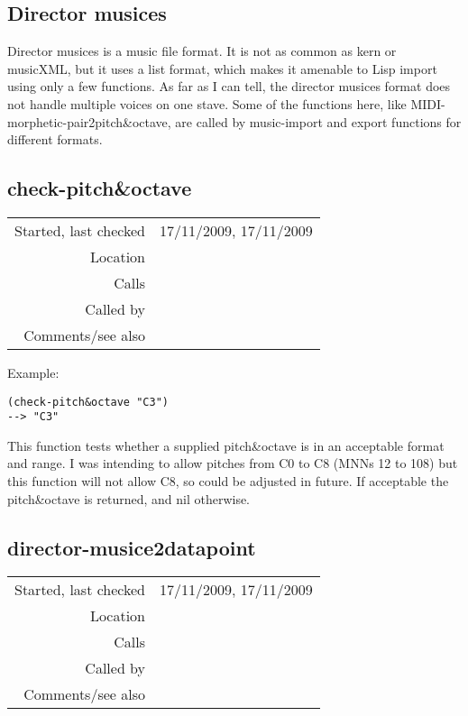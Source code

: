 \subsection{Director musices}\label{sec:director-musices}

Director musices is a music file format. It is not as
common as kern or musicXML, but it uses a list format,
which makes it amenable to Lisp import using only a
few functions. As far as I can tell, the director
musices format does not handle multiple voices on one
stave. Some of the functions here, like
MIDI-morphetic-pair2pitch\&octave, are called by
music-import and export functions for different
formats.


\subsection*{check-pitch\&octave}\label{fun:check-pitch-and-octave}

\vspace{0.3cm}
\begin{tabular}{r|p{8cm}}
Started, last checked & 17/11/2009, 17/11/2009 \\
Location & \nameref{sec:director-musices} \\
Calls & \\
Called by & \\
Comments/see also &
\end{tabular}

\vspace{0.5cm}
\noindent Example:
\begin{verbatim}
(check-pitch&octave "C3")
--> "C3"
\end{verbatim}

\noindent This function tests whether a supplied
pitch\&octave is in an acceptable format and range. I
was intending to allow pitches from C0 to C8 (MNNs 12
to 108) but this function will not allow C8, so could
be adjusted in future. If acceptable the pitch\&octave
is returned, and nil otherwise.


\subsection*{director-musice2datapoint}\label{fun:director-musice2datapoint}

\vspace{0.3cm}
\begin{tabular}{r|p{8cm}}
Started, last checked & 17/11/2009, 17/11/2009 \\
Location & \nameref{sec:director-musices} \\
Calls & \nameref{fun:pitch-and-octave2MIDI-morphetic-pair} \\
Called by & \nameref{fun:director-musices2dataset-chunked} \\
Comments/see also &
\end{tabular}


